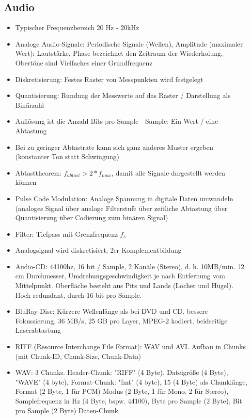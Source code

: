 \documentclass[12pt,landscape]{article}
\begin{document}
\begin{multicols}{3}
\section{Audio}
\begin{itemize}
\item Typischer Frequenzbereich 20 Hz - 20kHz
\item Analoge Audio-Signale: Periodische Signale (Wellen), Amplitude (maximaler Wert): Lautstärke, Phase bezeichnet den Zeitraum der Wiederholung, Obertöne sind Vielfaches einer Grundfrequenz
\item Diskretisierung: Festes Raster von Messpunkten wird festgelegt
\item Quantisierung: Rundung der Messwerte auf das Raster / Darstellung als Binärzahl
\item Auflösung ist die Anzahl Bits pro Sample - Sample: Ein Wert / eine Abtastung
\item Bei zu geringer Abtastrate kann sich ganz anderes Muster ergeben (konstanter Ton statt Schwingung)
\item Abtasttheorem: $f_{abtast} > 2 * f_{max}$, damit alle Signale dargestellt werden können
\item Pulse Code Modulation: Analoge Spannung in digitale Daten umwandeln (analoges Signal über analoge Filterstufe über zeitliche Abtastung über Quantisierung über Codierung zum binären Signal)
\item Filter: Tiefpass mit Grenzfrequenz $f_s$
\item Analogsignal wird diskretisiert, 2er-Komplementbildung
\item Audio-CD: 44100hz, 16 bit / Sample, 2 Kanäle (Stereo), d. h. 10MB/min. 12 cm Durchmesser, Umdrehungsgeschwindigkeit je nach Entfernung vom Mittelpunkt. Oberfläche besteht aus Pits und Lands (Löcher und Hügel). Hoch redundant, durch 16 bit pro Sample.
\item BluRay-Disc: Kürzere Wellenlänge als bei DVD und CD, bessere Fokussierung, 36 MB/s, 25 GB pro Layer, MPEG-2 kodiert, beidseitige Laserabtastung
\item RIFF (Resource Interchange File Format): WAV und AVI. Aufbau in Chunks (mit Chunk-ID, Chunk-Size, Chunk-Data)
\item WAV: 3 Chunks. Header-Chunk: "RIFF" (4 Byte), Dateigröße (4 Byte), "WAVE" (4 byte), Format-Chunk: "fmt" (4 byte), 15 (4 Byte) als Chunklänge, Format (2 Byte, 1 für PCM) Modus (2 Byte, 1 für Mono, 2 für Stereo), Samplefrequenz in Hz (4 Byte, bspw. 44100), Byte pro Sample (2 Byte), Bit pro Sample (2 Byte) Daten-Chunk

\end{itemize}
\end{multicols}
\end{document}
